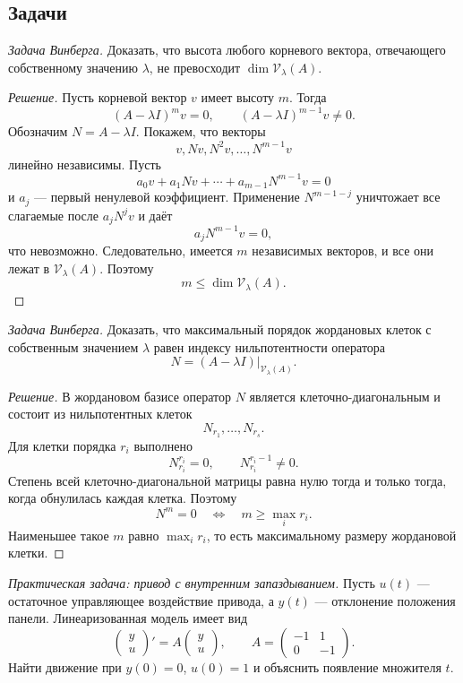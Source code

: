 \subsection*{Задачи}

\begin{problem}
\textit{Задача Винберга.}
Доказать, что высота любого корневого вектора, отвечающего собственному значению $\lambda$, не превосходит $\dim\mathcal V_\lambda(A)$.
\end{problem}

\begin{proof}[Решение]
Пусть корневой вектор $v$ имеет высоту $m$. Тогда
\[
(A-\lambda I)^m v=0,
\qquad
(A-\lambda I)^{m-1}v\neq0.
\]
Обозначим $N=A-\lambda I$. Покажем, что векторы
\[
v,Nv,N^2v,\dots,N^{m-1}v
\]
линейно независимы. Пусть
\[
a_0v+a_1Nv+\cdots+a_{m-1}N^{m-1}v=0
\]
и $a_j$ --- первый ненулевой коэффициент. Применение $N^{m-1-j}$ уничтожает все слагаемые после $a_jN^jv$ и даёт
\[
a_jN^{m-1}v=0,
\]
что невозможно. Следовательно, имеется $m$ независимых векторов, и все они лежат в $\mathcal V_\lambda(A)$. Поэтому
\[
m\leq\dim\mathcal V_\lambda(A).
\]
\end{proof}

\begin{problem}
\textit{Задача Винберга.}
Доказать, что максимальный порядок жордановых клеток с собственным значением $\lambda$ равен индексу нильпотентности оператора
\[
N=(A-\lambda I)|_{\mathcal V_\lambda(A)}.
\]
\end{problem}

\begin{proof}[Решение]
В жордановом базисе оператор $N$ является клеточно-диагональным и состоит из нильпотентных клеток
\[
N_{r_1},\dots,N_{r_s}.
\]
Для клетки порядка $r_i$ выполнено
\[
N_{r_i}^{r_i}=0,
\qquad
N_{r_i}^{r_i-1}\neq0.
\]
Степень всей клеточно-диагональной матрицы равна нулю тогда и только тогда, когда обнулилась каждая клетка. Поэтому
\[
N^m=0
\quad\Longleftrightarrow\quad
m\geq\max_i r_i.
\]
Наименьшее такое $m$ равно $\max_i r_i$, то есть максимальному размеру жордановой клетки.
\end{proof}

\begin{problem}
\textit{Практическая задача: привод с внутренним запаздыванием.}
Пусть $u(t)$ --- остаточное управляющее воздействие привода, а $y(t)$ --- отклонение положения панели. Линеаризованная модель имеет вид
\[
\begin{pmatrix}y\\u\end{pmatrix}'
=
A
\begin{pmatrix}y\\u\end{pmatrix},
\qquad
A=
\begin{pmatrix}
-1&1\\
0&-1
\end{pmatrix}.
\]
Найти движение при $y(0)=0$, $u(0)=1$ и объяснить появление множителя $t$.
\end{problem}

